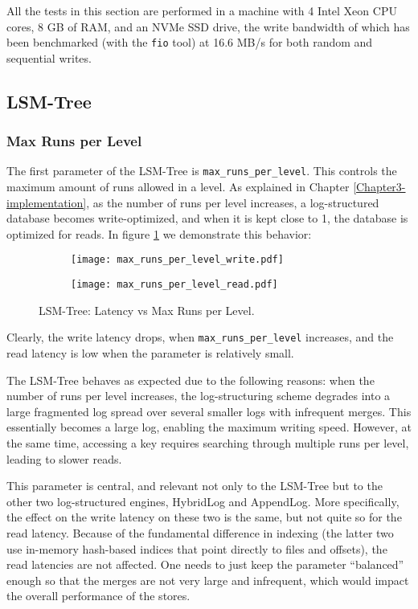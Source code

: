 All the tests in this section are performed in a machine with 4 Intel Xeon CPU cores, 8 GB of RAM, and an NVMe SSD drive, the write bandwidth of which has been benchmarked (with the \verb|fio| tool) at 16.6 MB/s for both random and sequential writes.

\subsection{LSM-Tree}

\subsubsection{Max Runs per Level}

The first parameter of the LSM-Tree is \verb"max_runs_per_level". This controls the maximum amount of runs allowed in a level. As explained in Chapter \ref{Chapter3-implementation}, as the number of runs per level increases, a log-structured database becomes write-optimized, and when it is kept close to 1, the database is optimized for reads. In figure \ref{fig:max-runs-per-level} we demonstrate this behavior:

\begin{figure}[h]
    \begin{subfigure}{.5\textwidth}
        \centering
        \texttt{[image: max\_runs\_per\_level\_write.pdf]}
    \end{subfigure}
    \begin{subfigure}{.5\textwidth}
        \centering
        \texttt{[image: max\_runs\_per\_level\_read.pdf]}
    \end{subfigure}
    \caption{LSM-Tree: Latency vs Max Runs per Level.}
    \label{fig:max-runs-per-level}
\end{figure}

Clearly, the write latency drops, when \verb"max_runs_per_level" increases, and the read latency is low when the parameter is relatively small.

The LSM-Tree behaves as expected due to the following reasons: when the number of runs per level increases, the log-structuring scheme degrades into a large fragmented log spread over several smaller logs with infrequent merges. This essentially becomes a large log, enabling the maximum writing speed. However, at the same time, accessing a key requires searching through multiple runs per level, leading to slower reads.

This parameter is central, and relevant not only to the LSM-Tree but to the other two log-structured engines, HybridLog and AppendLog. More specifically, the effect on the write latency on these two is the same, but not quite so for the read latency. Because of the fundamental difference in indexing (the latter two use in-memory hash-based indices that point directly to files and offsets), the read latencies are not affected. One needs to just keep the parameter ``balanced'' enough so that the merges are not very large and infrequent, which would impact the overall performance of the stores.

